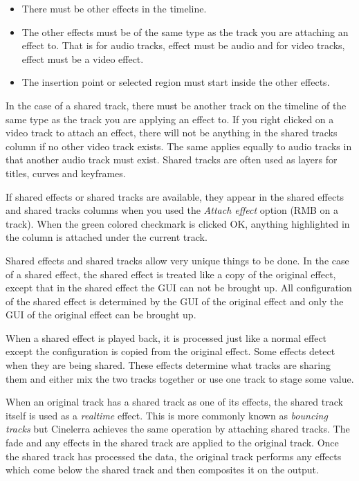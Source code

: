 \begin{itemize}[noitemsep]
    \item There must be other effects in the timeline.
    \item The other effects must be of the same type as the track you are attaching an effect to. That is for audio tracks, effect must be audio and for video tracks, effect must be a video effect.
    \item The insertion point or selected region must start inside the other effects.
\end{itemize}

In the case of a shared track, there must be another track on the timeline of the same type as the track you are applying an effect to. If you right clicked on a video track to attach an effect, there will not be anything in the shared tracks column if no other video track exists. The same applies equally to audio tracks in that another audio track must exist. Shared tracks are often used as layers for titles, curves and keyframes.

If shared effects or shared tracks are available, they appear in the shared effects and shared tracks columns when you used the \textit{Attach effect} option (RMB on a track). When the green colored checkmark is clicked OK, anything highlighted in the column is attached under the current track.

Shared effects and shared tracks allow very unique things to be done. In the case of a shared effect, the shared effect is treated like a copy of the original effect, except that in the shared effect the GUI can not be brought up. All configuration of the shared effect is determined by the GUI of the original effect and only the GUI of the original effect can be brought up.

When a shared effect is played back, it is processed just like a normal effect except the configuration is copied from the original effect. Some effects detect when they are being shared. These effects determine what tracks are sharing them and either mix the two tracks together or use one track to stage some value. 

When an original track has a shared track as one of its effects, the shared track itself is used as a \textit{realtime} effect. This is more commonly known as \textit{bouncing tracks} but Cinelerra achieves the same operation by attaching shared tracks. The fade and any effects in the shared track are applied to the original track. Once the shared track has processed the data, the original track performs any effects which come below the shared track and then composites it on the output.

